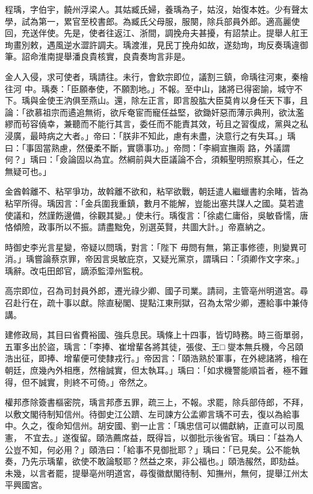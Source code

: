 \begin{pinyinscope}
 程瑀，字伯宇，饒州浮梁人。其姑臧氏婦，養瑀為子，姑沒，始復本姓。少有聲太學，試為第一，累官至校書郎。為臧氏父母服，服闋，除兵部員外郎。適高麗使回，充送伴使。先是，使者往返江、浙間，調挽舟夫甚擾，有詔禁止。提舉人舡王珣畫別敕，遇風逆水澀許調夫。瑀渡淮，見民丁挽舟如故，遂劾珣，珣反奏瑀違御筆。詔命淮南提舉潘良貴核實，良貴奏珣言非是。



 金人入侵，求可使者，瑀請往。未行，會欽宗即位，議割三鎮，命瑀往河東，秦檜往河
 中。瑀奏：「臣願奉使，不願割地。」不報。至中山，諸將已得密諭，城守不下。瑀與金使王汭俱至燕山。還，除左正言，即言股肱大臣莫肯以身任天下事，且論：「欲慕祖宗而遹追無術，欲斥奄宦而寵任益堅，欲鋤奸惡而薄示典刑，欲汰濫繆而茍容僥幸，兼聽而不能行其言，委任而不能責其效，茍且之習復成，黨與之私浸廣，最時病之大者。」帝曰：「朕非不知此，慮有未盡，決意行之有失耳。」瑀曰：「事固當熟慮，然優柔不斷，實隳事功。」帝問：「李綱宣撫兩
 路，外議謂何？」瑀曰：「僉論固以為宜。然綱前與大臣議論不合，須賴聖明照察其心，任之無疑可也。」



 金酋斡離不、粘罕爭功，故斡離不欲和，粘罕欲戰，朝廷遣人繼蠟書約余睹，皆為粘罕所得。瑀因言：「金兵圍我重鎮，數月不能解，豈能出塞共謀人之國。莫若遣使議和，然謹飭邊備，徐觀其變。」使未行。瑀復言：「徐處仁庸俗，吳敏昏懦，唐恪傾險，政事所以不振。請盡黜免，別選英賢，共圖大計。」帝嘉納之。



 時御史李光言星變，帝疑以問瑀，對言：「陛下
 毋問有無，第正事修德，則變異可消。」瑀嘗論蔡京罪，帝因言吳敏庇京，又疑光黨京，謂瑀曰：「須卿作文字來。」瑀辭。改屯田郎官，謫添監漳州監稅。



 高宗即位，召為司封員外郎，遷光祿少卿、國子司業。請祠，主管亳州明道宮。尋召赴行在，疏十事以獻。除直秘閣、提點江東刑獄，召為太常少卿，遷給事中兼侍講。



 建修政局，其目曰省費裕國、強兵息民。瑀條上十四事，皆切時務。時三衙單弱，五軍多出於盜，瑀言：「李捧、崔增輩各將其徒，張俊、王□
 燮本無兵機，今呂頤浩出征，即捧、增輩便可使隸戎行。」帝因言：「頤浩熟於軍事，在外總諸將，檜在朝廷，庶幾內外相應，然檜誠實，但太執耳。」瑀曰：「如求機警能順旨者，極不難得，但不誠實，則終不可倚。」帝然之。



 權邦彥除簽書樞密院，瑀言邦彥五罪，疏三上，不報。求罷，除兵部侍郎，不拜，以敷文閣待制知信州。待御史江公躋、左司諫方公孟卿言瑀不可去，復以為給事中。久之，復命知信州。胡安國、劉一止言：「瑀忠信可以備獻納，正直可以司風憲，
 不宜去。」遂復留。頤浩薦席益，既得旨，以御批示後省官。瑀曰：「益為人公豈不知，何必用？」頤浩曰：「給事不見御批耶？」瑀曰：「已見矣。公不能執奏，乃先示瑀輩，欲使不敢論駁耶？然益之來，非公福也。」頤浩赧然，即劾益。未幾，以言者罷，提舉亳州明道宮，尋復徽猷閣待制、知撫州，無何，提舉江州太平興國宮。




\end{pinyinscope}
